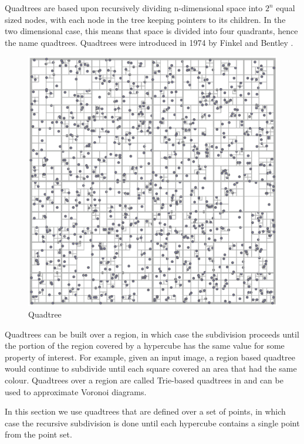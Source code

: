 \documentclass[mcs]{scsthesis}
\begin{document}
Quadtrees are based upon recursively dividing n-dimensional space into \(2^n\)
equal sized nodes, with each node in the tree keeping pointers to its
children.  In the two dimensional case, this means that space is divided into
four quadrants, hence the name quadtrees. Quadtrees were introduced in 1974 by
Finkel and Bentley \cite{quadtree}. 

\begin{figure}
\begin{center}
\includegraphics[scale=0.35]{diagrams/quadtree.eps}
\caption{Quadtree}
\label{fig:quadtree}
\end{center}
\end{figure}

Quadtrees can be built over a region, in which case the subdivision proceeds
until the portion of the region covered by a hypercube has the same value for
some property of interest. For example, given an input image, a region based
quadtree would continue to subdivide until each square covered an area that 
had the same colour. Quadtrees over a region are called Trie-based quadtrees in
\cite{samet} and can be used to approximate Voronoi diagrams.

In this section we use quadtrees that are defined over a set of points, in which
case the recursive subdivision is done until each hypercube contains a single
point from the point set.
\end{document}
